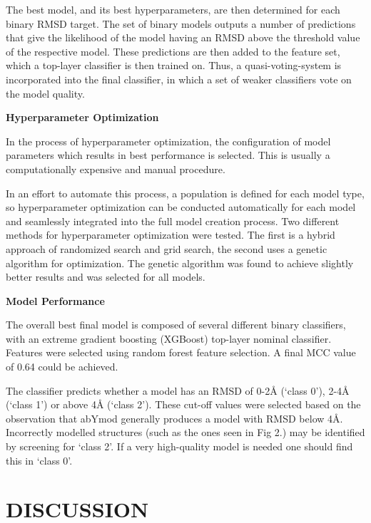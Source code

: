 \documentclass[
]{article}
\begin{document}
The best model, and its best hyperparameters, are then determined for
each binary RMSD target. The set of binary models outputs a number of
predictions that give the likelihood of the model having an RMSD above
the threshold value of the respective model. These predictions are then
added to the feature set, which a top-layer classifier is then trained
on. Thus, a quasi-voting-system is incorporated into the final
classifier, in which a set of weaker classifiers vote on the model
quality.

\textbf{Hyperparameter Optimization}

In the process of hyperparameter optimization, the configuration of
model parameters which results in best performance is selected. This is
usually a computationally expensive and manual procedure.

In an effort to automate this process, a population is defined for each
model type, so hyperparameter optimization can be conducted
automatically for each model and seamlessly integrated into the full
model creation process. Two different methods for hyperparameter
optimization were tested. The first is a hybrid approach of randomized
search and grid search, the second uses a genetic algorithm for
optimization. The genetic algorithm was found to achieve slightly better
results and was selected for all models.

\textbf{Model Performance}

The overall best final model is composed of several different binary
classifiers, with an extreme gradient boosting (XGBoost) top-layer
nominal classifier. Features were selected using random forest feature
selection. A final MCC value of 0.64 could be achieved.

The classifier predicts whether a model has an RMSD of 0-2Å (`class 0'),
2-4Å (`class 1') or above 4Å (`class 2'). These cut-off values were
selected based on the observation that abYmod generally produces a model
with RMSD below 4Å. Incorrectly modelled structures (such as the ones
seen in Fig 2.) may be identified by screening for `class 2'. If a very
high-quality model is needed one should find this in `class 0'.

\hypertarget{section}{%
\section{}\label{section}}

\hypertarget{discussion}{%
\section{DISCUSSION}\label{discussion}}
\end{document}
